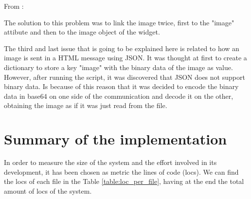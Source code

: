 From \cite{tkinter_images_double_ref}:


The solution to this problem was to link the image twice, first to the "image" attibute and then to the image object of the widget.

The third and last issue that is going to be explained here is related to how an image is sent in a HTML message using JSON. It was thought at first to create a dictionary to store a key "image" with the binary data of the image as value. However, after running the script, it was discovered that JSON does not support binary data. Is because of this reason that it was decided to encode the binary data in \gls{base64} on one side of the communication and decode it on the other, obtaining the image as if it was just read from the file.

\section{Summary of the implementation}
In order to measure the size of the system and the effort involved in its development, it has been chosen as metric the lines of code (\glspl{loc}). We can find the \glspl{loc} of each file in the Table \ref{table:loc_per_file}, having at the end the total amount of \glspl{loc} of the system.

